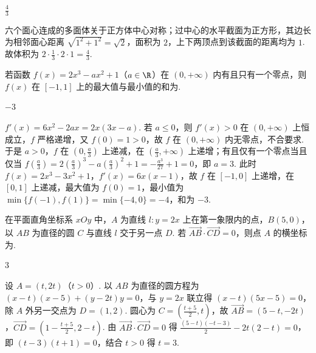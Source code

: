 \begin{answer}
\(\frac{4}{3}\)
\end{answer}

\begin{solution}
六个面心连成的多面体关于正方体中心对称；过中心的水平截面为正方形，其边长为相邻面心距离 \(\sqrt{1^2+1^2}=\sqrt2\)，面积为 \(2\)，上下两顶点到该截面的距离均为 \(1\). 故体积为 \(2\cdot\frac13\cdot2\cdot1=\frac43\).
\end{solution}

\begin{problem}
若函数 \(f(x)=2x^3-ax^2+1\)（\(a\in\R\)）在 \((0,+\infty)\) 内有且只有一个零点，则 \(f(x)\) 在 \([-1,1]\) 上的最大值与最小值的和为\fillinblank{}.
\end{problem}

\begin{answer}
\(-3\)
\end{answer}

\begin{solution}
\(f'(x)=6x^2-2ax=2x(3x-a)\). 若 \(a\leqslant0\)，则 \(f'(x)>0\) 在 \((0,+\infty)\) 上恒成立，\(f\) 严格递增，又 \(f(0)=1>0\)，故 \(f\) 在 \((0,+\infty)\) 内无零点，不合要求. 于是 \(a>0\)，\(f\) 在 \(\left(0,\frac{a}{3}\right)\) 上递减，在 \(\left(\frac{a}{3},+\infty\right)\) 上递增；有且仅有一个零点当且仅当 \(f\left(\frac{a}{3}\right)=2\left(\frac{a}{3}\right)^3-a\left(\frac{a}{3}\right)^2+1=-\frac{a^3}{27}+1=0\)，即 \(a=3\). 此时 \(f(x)=2x^3-3x^2+1\)，\(f'(x)=6x(x-1)\)，故 \(f\) 在 \([-1,0]\) 上递增，在 \([0,1]\) 上递减，最大值为 \(f(0)=1\)，最小值为 \(\min\{f(-1),f(1)\}=\min\{-4,0\}=-4\)，和为 \(-3\).
\end{solution}

\begin{problem}
在平面直角坐标系 \(xOy\) 中，\(A\) 为直线 \(l:y=2x\) 上在第一象限内的点，\(B(5,0)\)，以 \(AB\) 为直径的圆 \(C\) 与直线 \(l\) 交于另一点 \(D\). 若 \(\overrightarrow{AB}\cdot\overrightarrow{CD}=0\)，则点 \(A\) 的横坐标为\fillinblank{}.

\end{problem}

\begin{answer}
\(3\)
\end{answer}

\begin{solution}
设 \(A=(t,2t)\)（\(t>0\)）. 以 \(AB\) 为直径的圆方程为 \((x-t)(x-5)+(y-2t)y=0\)，与 \(y=2x\) 联立得 \((x-t)(5x-5)=0\)，除 \(A\) 外另一交点为 \(D=(1,2)\). 圆心为 \(C=\left(\frac{t+5}{2},t\right)\)，故 \(\overrightarrow{AB}=(5-t,-2t)\)，\(\overrightarrow{CD}=\left(1-\frac{t+5}{2},2-t\right)\). 由 \(\overrightarrow{AB}\cdot\overrightarrow{CD}=0\) 得 \(\frac{(5-t)(-t-3)}{2}-2t(2-t)=0\)，即 \((t-3)(t+1)=0\)，结合 \(t>0\) 得 \(t=3\).
\end{solution}


